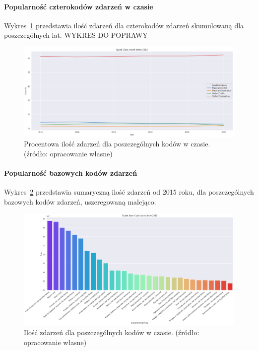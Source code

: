 \documentclass[11pt]{report}
\begin{document}
    \paragraph{Popularność czterokodów zdarzeń w czasie}
    Wykres~\ref{fig:GLOBALQCperc} przedstawia ilość zdarzeń dla czterokodów zdarzeń skumulowaną dla poszczególnych lat.
    WYKRES DO POPRAWY
    \begin{figure}[ht!]
        \centering
        \includegraphics[width=1 \textwidth]{fig/GLOBAL/QCperc.png}
        \caption{Procentowa ilość zdarzeń dla poszczególnych kodów w czasie. (źródło: opracowanie własne)}
        \label{fig:GLOBALQCperc}
    \end{figure}

    \paragraph{Popularność bazowych kodów zdarzeń}
    Wykres~\ref{fig:GLOBALEBC} przedstawia sumaryczną ilość zdarzeń od 2015 roku, dla poszczególnych bazowych kodów zdarzeń, uszeregowaną malejąco.
    \begin{figure}[ht!]
        \centering
        \includegraphics[width=1 \textwidth]{fig/GLOBAL/EBC.png}
        \caption{Ilość zdarzeń dla poszczególnych kodów w czasie. (źródło: opracowanie własne)}
        \label{fig:GLOBALEBC}
    \end{figure}
\end{document}
